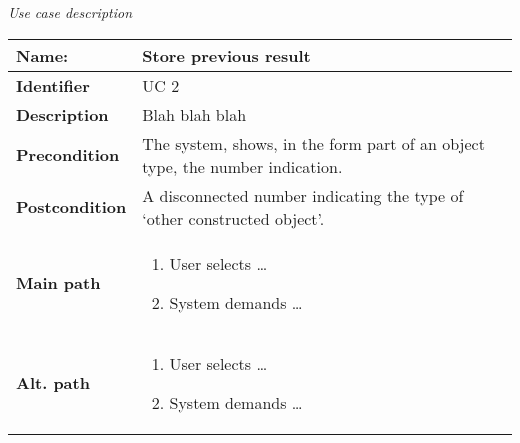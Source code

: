 \documentclass{article}
\newcommand\addrow[2]{#1 &#2\\ }
\newcommand\addheading[2]{#1 &#2\\ \hline}
\newcommand\tabularhead{\begin{tabular}{lp{10cm}}
\hline
}
\newcommand\addmulrow[2]{ \begin{minipage}[t][][t]{2.5cm}#1\end{minipage}%
   &\begin{minipage}[t][][t]{10cm}
    \begin{enumerate} #2   \end{enumerate}
    \end{minipage}\\ }
\newenvironment{usecase}{\tabularhead}
{\hline\end{tabular}}
\begin{document}
{\Large\textit{Use case description}} \\
\begin{usecase}
  \addheading{\textbf{Name:}}{Store previous result}
  \addheading{\textbf{Identifier}}{UC 2}
  \addrow{\textbf{Description}}{Blah blah blah}
  \addrow{\textbf{Precondition}}{The system, shows, in the form part of an object type, the number   indication.}
  \addrow{\textbf{Postcondition}}{A disconnected number indicating the type of `other constructed object'.}
  \addmulrow{\textbf{Main path}}{
  	\item User selects \ldots
    \item System demands \ldots}
  \addmulrow{\textbf{Alt. path}}{
  	\item User selects \ldots
    \item System demands \ldots}
\end{usecase}
\end{document}
